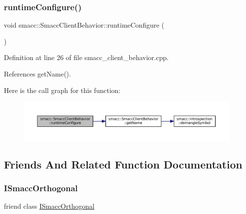 \subsubsection{\texorpdfstring{runtime\+Configure()}{runtimeConfigure()}}
{\footnotesize\ttfamily void smacc\+::\+Smacc\+Client\+Behavior\+::runtime\+Configure (\begin{DoxyParamCaption}{ }\end{DoxyParamCaption})\hspace{0.3cm}{\ttfamily [virtual]}}



Definition at line 26 of file smacc\+\_\+client\+\_\+behavior.\+cpp.



References get\+Name().


Here is the call graph for this function\+:
\nopagebreak
\begin{figure}[H]
\begin{center}
\leavevmode
\includegraphics[width=350pt]{classsmacc_1_1SmaccClientBehavior_a228b90d814511a24907c5d65553bcba2_cgraph}
\end{center}
\end{figure}


\subsection{Friends And Related Function Documentation}
\mbox{\label{classsmacc_1_1SmaccClientBehavior_a7205cc84a71fea903124d54d01e99a68}} 
\subsubsection{\texorpdfstring{I\+Smacc\+Orthogonal}{ISmaccOrthogonal}}
{\footnotesize\ttfamily friend class \hyperlink{classsmacc_1_1ISmaccOrthogonal}{I\+Smacc\+Orthogonal}\hspace{0.3cm}{\ttfamily [friend]}}



